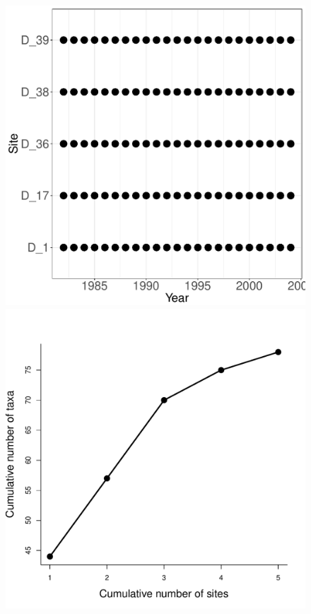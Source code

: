 \documentclass[11pt, oneside]{article}
\begin{document}
\begin{figure}[h!]
\includegraphics[scale = 0.4]{cdr-plantsD-compagnoni_spatiotemporal_sampling_effort.pdf}
\includegraphics[scale = 0.4]{cdr-plantsD-compagnoni_species_accumulation_space.pdf}

\end{figure}
\end{document}
